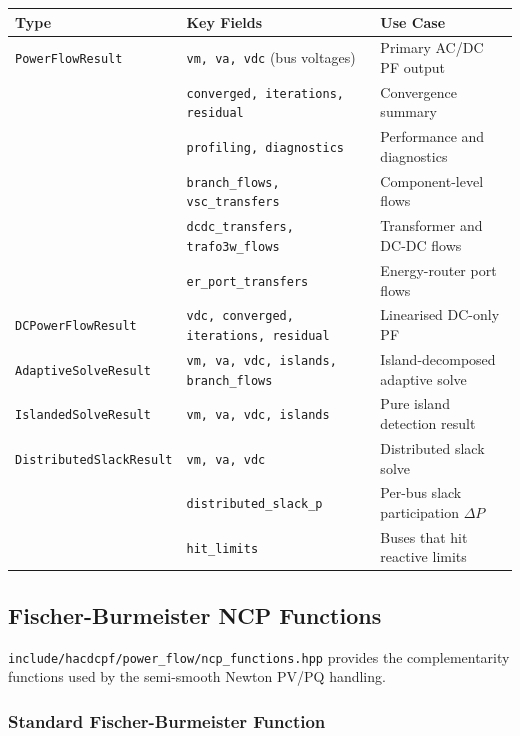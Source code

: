 \begin{longtable}{lll}
\hline\hline
\textbf{Type} & \textbf{Key Fields} & \textbf{Use Case} \\
\hline\endhead\hline\endfoot
\texttt{PowerFlowResult} & \texttt{vm, va, vdc} (bus voltages) & Primary AC/DC PF output \\
 & \texttt{converged, iterations, residual} & Convergence summary \\
 & \texttt{profiling, diagnostics} & Performance and diagnostics \\
 & \texttt{branch\_flows, vsc\_transfers} & Component-level flows \\
 & \texttt{dcdc\_transfers, trafo3w\_flows} & Transformer and DC-DC flows \\
 & \texttt{er\_port\_transfers} & Energy-router port flows \\
\hline
\texttt{DCPowerFlowResult} & \texttt{vdc, converged, iterations, residual} & Linearised DC-only PF \\
\hline
\texttt{AdaptiveSolveResult} & \texttt{vm, va, vdc, islands, branch\_flows} & Island-decomposed adaptive solve \\
\hline
\texttt{IslandedSolveResult} & \texttt{vm, va, vdc, islands} & Pure island detection result \\
\hline
\texttt{DistributedSlackResult} & \texttt{vm, va, vdc} & Distributed slack solve \\
 & \texttt{distributed\_slack\_p} & Per-bus slack participation $\Delta P$ \\
 & \texttt{hit\_limits} & Buses that hit reactive limits \\
\hline\hline
\end{longtable}

\subsection{Fischer-Burmeister NCP Functions}
\label{sec:ncp}

\texttt{include/hacdcpf/power\_flow/ncp\_functions.hpp} provides the
complementarity functions used by the semi-smooth Newton PV/PQ handling.

\subsubsection{Standard Fischer-Burmeister Function}

